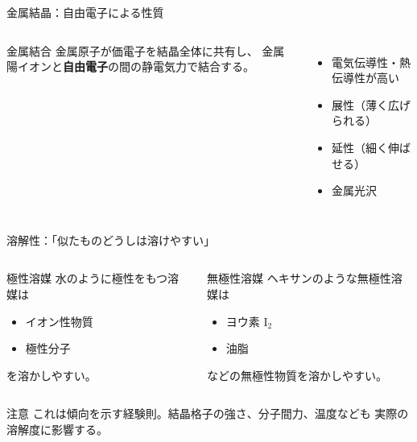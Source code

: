 \documentclass[notheorems,aspectratio=169]{beamer}
\newcommand{\jp}[1]{\textbf{\color{JapanBlue}#1}}
\newcommand{\chem}[1]{\mathrm{#1}}
\begin{document}
\begin{frame}{金属結晶：自由電子による性質}
  \begin{columns}[T,onlytextwidth]
    \begin{block}{金属結合}
      金属原子が価電子を結晶全体に共有し、
      金属陽イオンと\jp{自由電子}の間の静電気力で結合する。
    \end{block}
    \begin{itemize}
      \item 電気伝導性・熱伝導性が高い
      \item 展性（薄く広げられる）
      \item 延性（細く伸ばせる）
      \item 金属光沢
    \end{itemize}
    \centering
  \end{columns}
\end{frame}

\begin{frame}{溶解性：「似たものどうしは溶けやすい」}
  \begin{columns}[T,onlytextwidth]
    \begin{block}{極性溶媒}
      水のように極性をもつ溶媒は
      \begin{itemize}
        \item イオン性物質
        \item 極性分子
      \end{itemize}
      を溶かしやすい。
    \end{block}
    \begin{exampleblock}{無極性溶媒}
      ヘキサンのような無極性溶媒は
      \begin{itemize}
        \item ヨウ素 $\chem{I_2}$
        \item 油脂
      \end{itemize}
      などの無極性物質を溶かしやすい。
    \end{exampleblock}
  \end{columns}

  \begin{alertblock}{注意}
    これは傾向を示す経験則。結晶格子の強さ、分子間力、温度なども
    実際の溶解度に影響する。
  \end{alertblock}
\end{frame}
\end{document}
